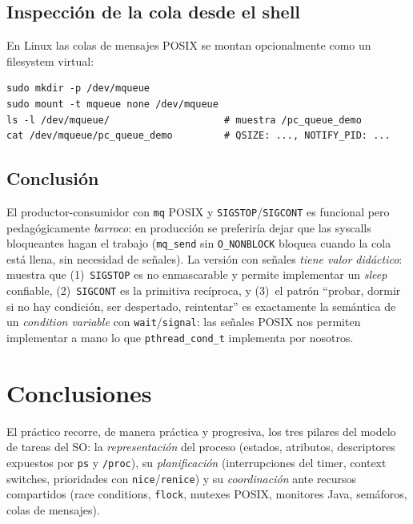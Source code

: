 \documentclass[11pt,a4paper]{article}
\begin{document}
\subsection*{Inspección de la cola desde el shell}

En Linux las colas de mensajes POSIX se montan opcionalmente como un
filesystem virtual:

\begin{lstlisting}
sudo mkdir -p /dev/mqueue
sudo mount -t mqueue none /dev/mqueue
ls -l /dev/mqueue/                    # muestra /pc_queue_demo
cat /dev/mqueue/pc_queue_demo         # QSIZE: ..., NOTIFY_PID: ...
\end{lstlisting}

\subsection*{Conclusión}

El productor-consumidor con \texttt{mq} POSIX y
\texttt{SIGSTOP}/\texttt{SIGCONT} es funcional pero pedagógicamente
\emph{barroco}: en producción se preferiría dejar que las syscalls
bloqueantes hagan el trabajo (\texttt{mq\_send} sin \texttt{O\_NONBLOCK}
bloquea cuando la cola está llena, sin necesidad de señales). La
versión con señales \emph{tiene valor didáctico}: muestra que
(1)~\texttt{SIGSTOP} es no enmascarable y permite implementar un
\emph{sleep} confiable, (2)~\texttt{SIGCONT} es la primitiva
recíproca, y (3)~el patrón ``probar, dormir si no hay condición,
ser despertado, reintentar'' es exactamente la semántica de un
\emph{condition variable} con \texttt{wait}/\texttt{signal}: las
señales POSIX nos permiten implementar a mano lo que \texttt{pthread\_cond\_t}
implementa por nosotros.

\section{Conclusiones}

El práctico recorre, de manera práctica y progresiva, los tres pilares
del modelo de tareas del SO: la \emph{representación} del proceso
(estados, atributos, descriptores expuestos por \texttt{ps} y
\texttt{/proc}), su \emph{planificación} (interrupciones del timer,
context switches, prioridades con \texttt{nice}/\texttt{renice}) y su
\emph{coordinación} ante recursos compartidos (race conditions,
\texttt{flock}, mutexes POSIX, monitores Java, semáforos, colas de
mensajes).
\end{document}
